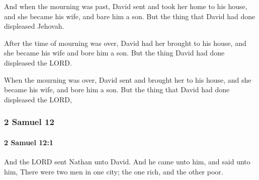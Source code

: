 			\begin{versebox}
					\item[BHS] 
					\item[ASV] And when the mourning was past, David sent and took her home to his house, and she became his wife, and bare him a son. But the thing that David had done displeased Jehovah.
					\item[NIV] After the time of mourning was over, David had her brought to his house, and she became his wife and bore him a son. But the thing David had done displeased the LORD.
					\item[NRSV] When the mourning was over, David sent and brought her to his house, and she became his wife, and bore him a son. But the thing that David had done displeased the LORD,
			\end{versebox}
	\subsubsection{2 Samuel 12} %
		\label{2SAMUEL-12}

		\paragraph{2 Samuel 12:1} %
			\label{2SAMUEL-12-1}

			And the LORD sent Nathan unto David. And he came unto him, and said unto him, There were two men in one city; the one rich, and the other poor.

